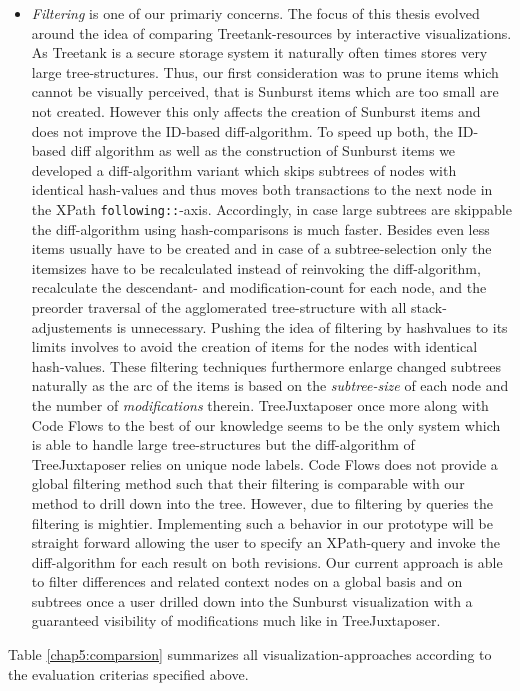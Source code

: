 \begin{itemize}
\item \emph{Filtering} is one of our primariy concerns. The focus of this thesis evolved around the idea of comparing Treetank-resources by interactive visualizations. As Treetank is a secure storage system it naturally often times stores very large tree-structures. Thus, our first consideration was to prune items which cannot be visually perceived, that is Sunburst items which are too small are not created. However this only affects the creation of Sunburst items and does not improve the ID-based diff-algorithm. To speed up both, the ID-based diff algorithm as well as the construction of Sunburst items we developed a diff-algorithm variant which skips subtrees of nodes with identical hash-values and thus moves both transactions to the next node in the XPath \texttt{following::}-axis. Accordingly, in case large subtrees are skippable the diff-algorithm using hash-comparisons is much faster. Besides even less items usually have to be created and in case of a subtree-selection only the itemsizes have to be recalculated instead of reinvoking the diff-algorithm, recalculate the descendant- and modification-count for each node, and the preorder traversal of the agglomerated tree-structure with all stack-adjustements is unnecessary. Pushing the idea of filtering by hashvalues to its limits involves to avoid the creation of items for the nodes with identical hash-values. These filtering techniques furthermore enlarge changed subtrees naturally as the arc of the items is based on the \emph{subtree-size} of each node and the number of \emph{modifications} therein. TreeJuxtaposer once more along with Code Flows to the best of our knowledge seems to be the only system which is able to handle large tree-structures but the diff-algorithm of TreeJuxtaposer relies on unique node labels. Code Flows does not provide a global filtering method such that their filtering is comparable with our method to drill down into the tree. However, due to filtering by queries the filtering is mightier. Implementing such a behavior in our prototype will be straight forward allowing the user to specify an XPath-query and invoke the diff-algorithm for each result on both revisions. Our current approach is able to filter differences and related context nodes on a global basis and on subtrees once a user drilled down into the Sunburst visualization with a guaranteed visibility of modifications much like in TreeJuxtaposer.
\end{itemize}

Table \ref{chap5:comparsion} summarizes all visualization-approaches according to the evaluation criterias specified above.

